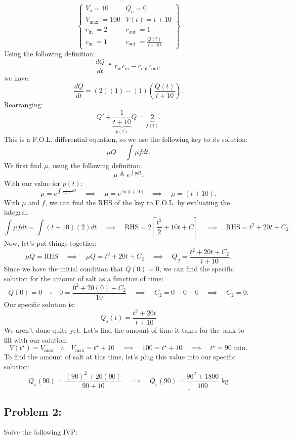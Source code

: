 \documentclass[a4paper,12pt]{article}
\begin{document}
$$\left\{\begin{array}{ll}V_o=10 & Q_o=0 \\ V_{\text {max }}=100 & V(t)=t+10 \\ r_{\text {in }}=2 & r_{\text {out }}=1 \\ c_{\text {in }}=1 & c_{\text {out }}=\frac{Q(t)}{t+10}\end{array}\right\}$$
Using the following definition:
$$ \frac{dQ}{dt} \triangleq r_{\text{in}}c_{\text{in}} - r_{\text{out}}c_{\text{out}},$$
we have:
$$ \frac{dQ}{dt} = (2)(1) - (1)\left(\frac{Q(t)}{t+10}\right). $$
Rearranging:
$$ Q' + \underbrace{\frac{1}{t+10}}_{p(t)}Q = \underbrace{2}_{f(t)}. $$
This is a F.O.L. differential equation, so we use the following key to its solution:
$$ \mu Q = \int \mu f dt. $$
We first find $\mu$, using the following definition:
$$ \mu \triangleq e^{\int pdt}. $$
With our value for $p(t)$:
$$ \mu = e^{\int \frac{1}{t+10}dt} \quad\implies\quad \mu = e^{\ln{|t+10|}} \quad\implies\quad \mu = (t+10). $$
With $\mu$ and $f$, we can find the RHS of the key to F.O.L. by evaluating the integral:
$$ \int \mu f dt = \int (t+10)(2)dt \quad\implies\quad \text{RHS} = 2\left[\frac{t^2}{2} + 10t + C\right] \quad\implies\quad \text{RHS} = t^2 + 20t + C_2. $$
Now, let's put things together:
$$ \mu Q = \text{RHS} \quad\implies\quad \mu Q = t^2 + 20t + C_2 \quad\implies\quad Q_g = \frac{t^2 + 20t + C_2}{t + 10}. $$
Since we have the initial condition that $Q(0)=0$, we can find the specific solution for the amount of salt as a function of time:
$$ Q(0)=0 \quad\therefore\quad 0 = \frac{0^2 + 20(0) + C_2}{10} \quad\implies\quad C_2 = 0-0-0 \quad\implies\quad C_2 = 0. $$
Our specific solution is:
$$ \boxed{Q_s(t) = \frac{t^2 + 20t}{t + 10}} $$
We aren't done quite yet. Let's find the amount of time it takes for the tank to fill with our solution:
$$ V(t^{\star}) = V_{\text{max}} \quad\therefore\quad V_{\text{max}} = t^{\star} + 10 \quad\implies\quad 100 = t^{\star} + 10  \quad\implies\quad t^{\star} = 90{\text{ min}}.$$
To find the amount of salt at this time, let's plug this value into our specific solution:
$$ Q_{s}(90) = \frac{(90)^2 + 20(90)}{90 +10} \quad\implies\quad \underline{\boxed{Q_s(90) = \frac{90^2 + 1800}{100} \text{ kg}}} $$

\pagebreak

\subsection*{Problem 2:} Solve the following IVP:
\end{document}

